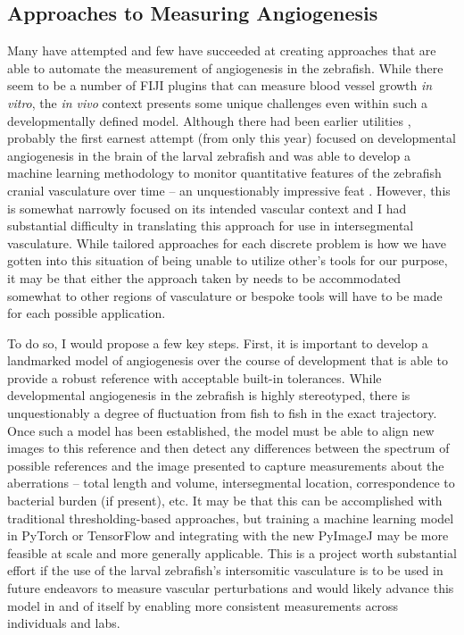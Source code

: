 \subsection{Approaches to Measuring Angiogenesis}\label{measureang}

Many have attempted and few have succeeded at creating approaches that are able to automate the measurement of angiogenesis in the zebrafish. While there seem to be a number of FIJI plugins that can measure blood vessel growth \textit{in vitro}, the \textit{in vivo} context presents some unique challenges even within such a developmentally defined model. Although there had been earlier utilities \citep{Heath2017}, probably the first earnest attempt (from only this year) focused on developmental angiogenesis in the brain of the larval zebrafish and was able to develop a machine learning methodology to monitor quantitative features of the zebrafish cranial vasculature over time -- an unquestionably impressive feat \citep{Kugler2022}. However, this is somewhat narrowly focused on its intended vascular context and I had substantial difficulty in translating this approach for use in intersegmental vasculature. While tailored approaches for each discrete problem is how we have gotten into this situation of being unable to utilize other's tools for our purpose, it may be that either the approach taken by \citeauthor{Kugler2022} needs to be accommodated somewhat to other regions of vasculature or bespoke tools will have to be made for each possible application. 

To do so, I would propose a few key steps. First, it is important to develop a landmarked model of angiogenesis over the course of development that is able to provide a robust reference with acceptable built\hyp{}in tolerances. While developmental angiogenesis in the zebrafish is highly stereotyped, there is unquestionably a degree of fluctuation from fish to fish in the exact trajectory. Once such a model has been established, the model must be able to align new images to this reference and then detect any differences between the spectrum of possible references and the image presented to capture measurements about the aberrations -- total length and volume, intersegmental location, correspondence to bacterial burden (if present), etc. It may be that this can be accomplished with traditional thresholding\hyp{}based approaches, but training a machine learning model in PyTorch or TensorFlow and integrating with the new PyImageJ may be more feasible at scale and more generally applicable. This is a project worth substantial effort if the use of the larval zebrafish's intersomitic vasculature is to be used in future endeavors to measure vascular perturbations and would likely advance this model in and of itself by enabling more consistent measurements across individuals and labs. 


